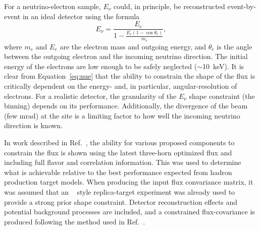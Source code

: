 For a neutrino-electron  sample, $E_{\nu}$ could, in principle, be reconstructed event-by-event in an ideal detector using the formula
\begin{equation}
  E_{\nu} = \frac{E_{e}}{1 - \frac{E_{e}(1-\cos\theta_{e})}{m_{e}}},
\label{eq:nue}
\end{equation}
\noindent where $m_e$ and $E_e$ are the electron mass and outgoing energy, and $\theta_e$ is the angle between the outgoing electron and the incoming neutrino direction. The initial energy of the electrons are low enough to be safely neglected ($\sim$\SI{10}{keV}). It is clear from Equation~\ref{eq:nue} that the ability to constrain the shape of the flux is critically dependent on the energy- and, in particular, angular-resolution of electrons. For a realistic detector, the granularity of the $E_{\nu}$ shape constraint (the binning) depends on its performance. Additionally, the divergence of the beam (few \si{mrad}) at the    site is a limiting factor to how well the incoming neutrino direction is known.

In work described in Ref.~\cite{dune_nue}, the ability for various proposed   components to constrain the  flux is shown using the latest three-horn optimized flux and including full flavor and correlation information.  This was used to determine what is achievable relative to the best performance expected from hadron production target models. When producing the input flux convariance matrix, it was assumed that an ~\cite{Laszlo:2009vg} style replica-target experiment was already used to provide a strong prior shape constraint. Detector reconstruction effects and potential background processes are included, and a constrained flux-covariance is produced following the method used in Ref.~\cite{Park:2015eqa}.

